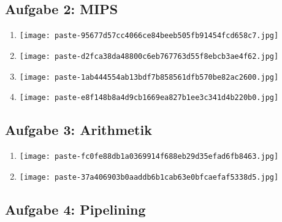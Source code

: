 \documentclass[12pt,a4paper]{article}
\begin{document}
\subsection*{Aufgabe 2: MIPS}

\begin{enumerate}[label=\alph*), topsep=5pt, itemsep=10pt]
\item \mbox{}\begin{center}\texttt{[image: paste-95677d57cc4066ce84beeb505fb91454fcd658c7.jpg]}
\end{center}
\item \mbox{}\begin{center}\texttt{[image: paste-d2fca38da48800c6eb767763d55f8ebcb3ae4f62.jpg]}
\end{center}
\item \mbox{}\begin{center}\texttt{[image: paste-1ab444554ab13bdf7b858561dfb570be82ac2600.jpg]}
\end{center}
\item \mbox{}\begin{center}\texttt{[image: paste-e8f148b8a4d9cb1669ea827b1ee3c341d4b220b0.jpg]}
\end{center}
\end{enumerate}
\clearpage
\subsection*{Aufgabe 3: Arithmetik}

\begin{enumerate}[label=\alph*), topsep=5pt, itemsep=10pt]
\item \mbox{}\begin{center}\texttt{[image: paste-fc0fe88db1a0369914f688eb29d35efad6fb8463.jpg]}
\end{center}
\item \mbox{}\begin{center}\texttt{[image: paste-37a406903b0aaddb6b1cab63e0bfcaefaf5338d5.jpg]}
\end{center}
\end{enumerate}
\clearpage
\subsection*{Aufgabe 4: Pipelining}
\end{document}
